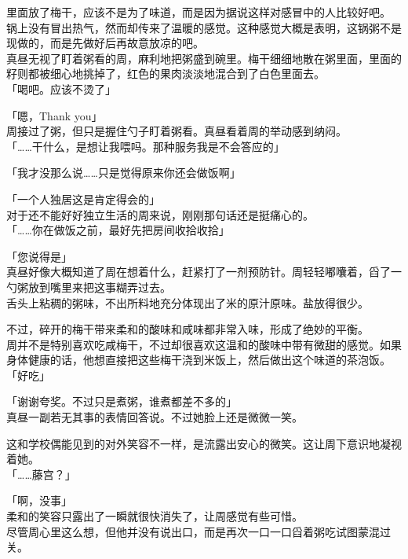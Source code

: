 里面放了梅干，应该不是为了味道，而是因为据说这样对感冒中的人比较好吧。\\

锅上没有冒出热气，然而却传来了温暖的感觉。这种感觉大概是表明，这锅粥不是现做的，而是先做好后再故意放凉的吧。\\

真昼无视了盯着粥看的周，麻利地把粥盛到碗里。梅干细细地散在粥里面，里面的籽则都被细心地挑掉了，红色的果肉淡淡地混合到了白色里面去。\\

「喝吧。应该不烫了」

「嗯，Thank you」\\

周接过了粥，但只是握住勺子盯着粥看。真昼看着周的举动感到纳闷。\\

「……干什么，是想让我喂吗。那种服务我是不会答应的」

「我才没那么说……只是觉得原来你还会做饭啊」

「一个人独居这是肯定得会的」\\

对于还不能好好独立生活的周来说，刚刚那句话还是挺痛心的。\\

「……你在做饭之前，最好先把房间收拾收拾」

「您说得是」\\

真昼好像大概知道了周在想着什么，赶紧打了一剂预防针。周轻轻嘟囔着，舀了一勺粥放到嘴里来把这事糊弄过去。\\

舌头上粘稠的粥味，不出所料地充分体现出了米的原汁原味。盐放得很少。

不过，碎开的梅干带来柔和的酸味和咸味都非常入味，形成了绝妙的平衡。\\

周并不是特别喜欢吃咸梅干，不过却很喜欢这温和的酸味中带有微甜的感觉。如果身体健康的话，他想直接把这些梅干浇到米饭上，然后做出这个味道的茶泡饭。\\

「好吃」

「谢谢夸奖。不过只是煮粥，谁煮都差不多的」\\

真昼一副若无其事的表情回答说。不过她脸上还是微微一笑。

这和学校偶能见到的对外笑容不一样，是流露出安心的微笑。这让周下意识地凝视着她。\\

「……藤宫？」

「啊，没事」\\

柔和的笑容只露出了一瞬就很快消失了，让周感觉有些可惜。\\

尽管周心里这么想，但他并没有说出口，而是再次一口一口舀着粥吃试图蒙混过关。
